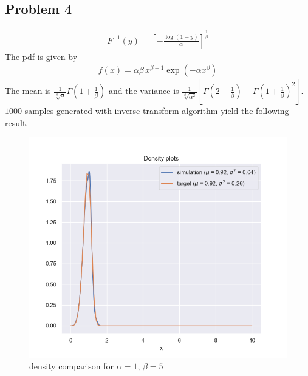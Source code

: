 \documentclass{article}
\begin{document}
\subsection*{Problem 4}
\begin{align*}
  F^{-1}(y) = \left[-\frac{\log(1-y)}{\alpha}\right]^{\frac{1}{\beta}}
\end{align*}
The pdf is given by
\begin{align*}
  f(x) = \alpha\beta\,x^{\beta-1}\exp(-\alpha x^{\beta})
\end{align*}
The mean is $\frac{1}{\sqrt[\beta]{\alpha}}\Gamma\left(1+\frac{1}{\beta}\right)$ and the variance is $\frac{1}{\sqrt[\beta]{\alpha^2}}\left[\Gamma\left(2+\frac{1}{\beta}\right)-\Gamma\left(1+\frac{1}{\beta}\right)^2\right]$.
$1000$ samples generated with inverse transform algorithm yield the following result.
\begin{figure}[h!]
    \centering
    \includegraphics[width=\linewidth]{../images/p4_density_it_1_5_1000.png}
    \caption{density comparison for $\alpha = 1,\,\beta = 5$}
\end{figure}
\newpage
\end{document}
